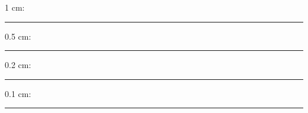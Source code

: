 
1 cm: \rule{10cm}{1cm}

\vskip 1in

0.5 cm: \rule{10cm}{0.5cm}

\vskip 1in


0.2 cm: \rule{10cm}{0.2cm}

\vskip 1in


0.1 cm: \rule{10cm}{0.1cm}


